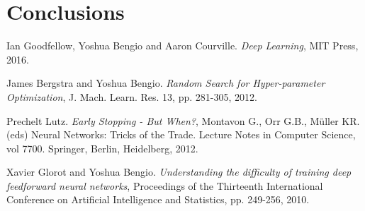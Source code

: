 \documentclass[11pt,twoside]{article}
\begin{document}

\clearpage

\section{Conclusions} %
\label{sec:conclusions}



\begin{thebibliography}{99} %
    Ian Goodfellow, Yoshua Bengio and Aaron Courville.
    \textit{Deep Learning}, MIT Press, 2016.

    James Bergstra and Yoshua Bengio.
    \textit{Random Search for Hyper-parameter Optimization}, J. Mach. Learn. Res. 13, pp. 281-305, 2012.

    Prechelt Lutz.
    \textit{Early Stopping - But When?}, Montavon G., Orr G.B., Müller KR. (eds) Neural Networks: Tricks of the
    Trade. Lecture Notes in Computer Science, vol 7700. Springer, Berlin, Heidelberg, 2012.

    Xavier Glorot and Yoshua Bengio.
    \textit{Understanding the difficulty of training deep feedforward neural networks},
    Proceedings of the Thirteenth International Conference on Artificial Intelligence and Statistics, pp.
    249-256, 2010.
\end{thebibliography}

\newpage


\end{document}
